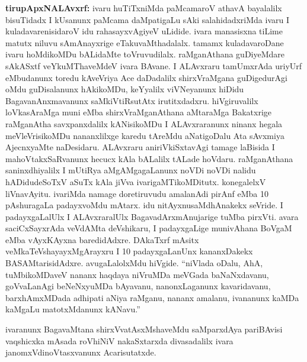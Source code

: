 {\textbf{tirupApxNALAvxrf:}} ivaru huTiTxniMda paMcamaroV athavA bayalalilx bisuTidadx I kUsanunx paMcama daMpatigaLu sAki salahidadxriMda ivaru I kuladavarenisidaroV idu rahasayxvAgiyeV uLidide. ivara manasisxna tiLime matutx niluvu sAmAnayxrige eTakuvaMthadalalx. tamamx kuladavaroDane ivaru hoMdikoMDu bALidaMte toVruvudilalx. raMganAthana guDiyeMdare sAkASxtf veYkuMThaveMdeV ivara BAvane. I ALAvxraru tamUmxrAda uriyUrf eMbudanunx toredu kAveVriya Ace daDadalilx shirxVraMgana guDigedurAgi oMdu guDisalanunx hAkikoMDu, keYyalilx viVNeyanunx hiDidu BagavanAnxmavanunx saMkiVtiRsutAtx irutitxdadxru. hiVgiruvalilx loVkasAraMga muni eMba shirxVraMganAthana aMtaraMga Bakatxrige raMganAtha savxpanxdalilx kANisikoMDu I ALAvxraranunx ninanx hegala meVleVrisikoMDu nananxlilxge karedu tAreMdu aNatigoDalu Ata sAvxmiya AjecnxyaMte naDesidaru. ALAvxraru aniriVkiSxtavAgi tamage laBisida I mahoVtakxSaRvanunx hecucx kAla bALalilx tALade hoVdaru. raMganAthana saninxdhiyalilx I mUtiRya aMgAMgagaLanunx noVDi noVDi nalidu hADidudeSoTxV aSuTx kAla jiVva ivarigaMTikoMDitutx. konegalelxV liVnavAyitu. ivariMda namage doretiruvudu amalanAdi pirAnf eMba {\rm 10} pAshuragaLa padayxvoMdu mAtarx. idu nitAyxnusaMdhAnakekx seVride. I padayxgaLalUlx I ALAvxraralUlx BagavadArxmAnujarige tuMba pirxVti. avara saciCxSayxrAda veVdAMta deVshikaru, I padayxgaLige munivAhana BoVgaM eMba vAyxKAyxna baredidAdxre. DAkaTxrf mAsitx veMkaTeVshayayxMgArayxru I {\rm 10} padayxgaLanUnx kananxDakekx BASAMtarisidAdxre. avugaLalolxMdu hiVgide. ``niVlada oDalu, AhA, tuMbikoMDaveV nananx haqdaya niVruMDa meVGada baNaNxdavanu, goVvaLanAgi beNeNxyuMDa bAyavanu, nanonxLaganunx kavaridavanu, barxhAmxMDada adhipati aNiya raMganu, nananx amalanu, ivananunx kaMDa kaMgaLu matotxMdanunx kANavu.''

ivaranunx BagavaMtana shirxVvatAsxMshaveMdu saMparxdAya pariBAvisi vaqshicxka mAsada roVhiNiV nakaSxtarxda divasadalilx ivara janomxVdinoVtasxvanunx Acarisutatxde.

